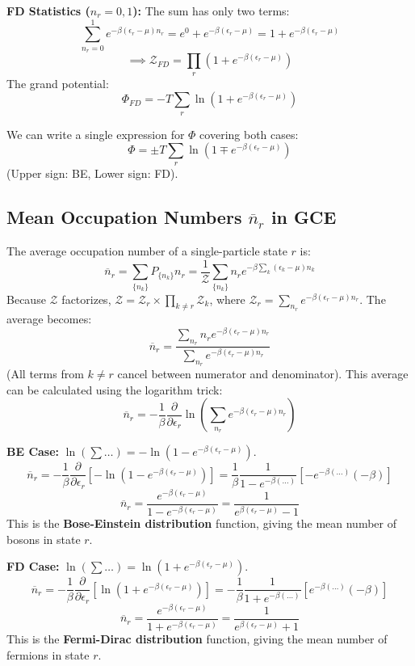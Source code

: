 \documentclass[11pt]{article}
\newcommand{\pderiv}[2]{\frac{\partial #1}{\partial #2}}
\newcommand{\grandpartfn}{\mathcal{Z}} %
\newcommand{\eps}{\epsilon}
\begin{document}
\textbf{FD Statistics ($n_r = 0, 1$):}
The sum has only two terms:
\[ \sum_{n_r=0}^{1} e^{-\beta(\eps_r-\mu)n_r} = e^0 + e^{-\beta(\eps_r-\mu)} = 1 + e^{-\beta(\eps_r-\mu)} \]
\[ \implies \grandpartfn_{FD} = \prod_r (1 + e^{-\beta(\eps_r-\mu)}) \]
The grand potential:
\[ \Phi_{FD} = -T \sum_r \ln(1 + e^{-\beta(\eps_r-\mu)}) \]

We can write a single expression for $\Phi$ covering both cases:
\[ \Phi = \pm T \sum_r \ln(1 \mp e^{-\beta(\eps_r-\mu)}) \]
(Upper sign: BE, Lower sign: FD).

\subsection*{Mean Occupation Numbers $\overline{n}_r$ in GCE}

The average occupation number of a single-particle state $r$ is:
\[ \overline{n}_r = \sum_{\{n_k\}} P_{\{n_k\}} n_r = \frac{1}{\grandpartfn} \sum_{\{n_k\}} n_r e^{-\beta \sum_k (\eps_k-\mu)n_k} \]
Because $\grandpartfn$ factorizes, $\grandpartfn = \grandpartfn_r \times \prod_{k \neq r} \grandpartfn_k$, where $\grandpartfn_r = \sum_{n_r} e^{-\beta(\eps_r-\mu)n_r}$.
The average becomes:
\[ \overline{n}_r = \frac{\sum_{n_r} n_r e^{-\beta(\eps_r-\mu)n_r}}{\sum_{n_r} e^{-\beta(\eps_r-\mu)n_r}} \]
(All terms from $k \neq r$ cancel between numerator and denominator).
This average can be calculated using the logarithm trick:
\[ \overline{n}_r = -\frac{1}{\beta} \pderiv{}{\eps_r} \ln\left( \sum_{n_r} e^{-\beta(\eps_r-\mu)n_r} \right) \]

\textbf{BE Case:} $\ln(\sum \dots) = -\ln(1 - e^{-\beta(\eps_r-\mu)})$.
\[ \overline{n}_r = -\frac{1}{\beta} \pderiv{}{\eps_r} [-\ln(1 - e^{-\beta(\eps_r-\mu)})] = \frac{1}{\beta} \frac{1}{1-e^{-\beta(\dots)}} [-e^{-\beta(\dots)}(-\beta)] \]
\[ \overline{n}_r = \frac{e^{-\beta(\eps_r-\mu)}}{1 - e^{-\beta(\eps_r-\mu)}} = \frac{1}{e^{\beta(\eps_r-\mu)} - 1} \]
This is the \textbf{Bose-Einstein distribution} function, giving the mean number of bosons in state $r$.

\textbf{FD Case:} $\ln(\sum \dots) = \ln(1 + e^{-\beta(\eps_r-\mu)})$.
\[ \overline{n}_r = -\frac{1}{\beta} \pderiv{}{\eps_r} [\ln(1 + e^{-\beta(\eps_r-\mu)})] = -\frac{1}{\beta} \frac{1}{1+e^{-\beta(\dots)}} [e^{-\beta(\dots)}(-\beta)] \]
\[ \overline{n}_r = \frac{e^{-\beta(\eps_r-\mu)}}{1 + e^{-\beta(\eps_r-\mu)}} = \frac{1}{e^{\beta(\eps_r-\mu)} + 1} \]
This is the \textbf{Fermi-Dirac distribution} function, giving the mean number of fermions in state $r$.
\end{document}
